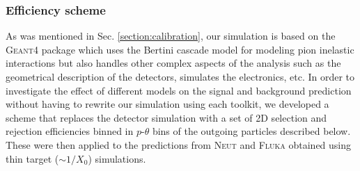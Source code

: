 \subsubsection{\bf{Efficiency scheme}}
As was mentioned in Sec. \ref{section:calibration}, our simulation is based on the \textsc{Geant4} package which uses the Bertini cascade model for modeling pion inelastic interactions but also handles other complex aspects of the analysis such as the geometrical description of the detectors, simulates the electronics, etc. In order to investigate the effect of different models on the signal and background prediction without having to rewrite our simulation using each toolkit, we developed a scheme that replaces the detector simulation with a set of 2D selection and rejection efficiencies binned in $p$-$\theta$ bins of the outgoing particles described below. These were then applied to the predictions from \textsc{Neut} and \textsc{Fluka} obtained using thin target ($\sim1/X_{0}$) simulations.
